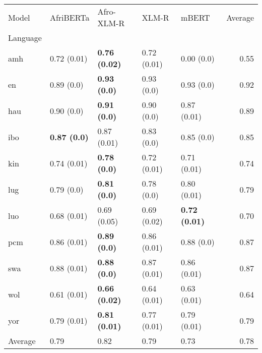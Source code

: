 \begin{tabular}{lllllr}
\toprule
Model &            AfriBERTa &            Afro-XLM-R &        XLM-R &                 mBERT & Average \\
Language &                      &                       &              &                       &         \\
\midrule
amh      &          0.72 (0.01) &  \textbf{0.76 (0.02)} &  0.72 (0.01) &            0.00 (0.0) &    0.55 \\
en       &           0.89 (0.0) &   \textbf{0.93 (0.0)} &   0.93 (0.0) &            0.93 (0.0) &    0.92 \\
hau      &           0.90 (0.0) &   \textbf{0.91 (0.0)} &   0.90 (0.0) &           0.87 (0.01) &    0.89 \\
ibo      &  \textbf{0.87 (0.0)} &           0.87 (0.01) &   0.83 (0.0) &            0.85 (0.0) &    0.85 \\
kin      &          0.74 (0.01) &   \textbf{0.78 (0.0)} &  0.72 (0.01) &           0.71 (0.01) &    0.74 \\
lug      &           0.79 (0.0) &   \textbf{0.81 (0.0)} &   0.78 (0.0) &           0.80 (0.01) &    0.79 \\
luo      &          0.68 (0.01) &           0.69 (0.05) &  0.69 (0.02) &  \textbf{0.72 (0.01)} &    0.70 \\
pcm      &          0.86 (0.01) &   \textbf{0.89 (0.0)} &  0.86 (0.01) &            0.88 (0.0) &    0.87 \\
swa      &          0.88 (0.01) &   \textbf{0.88 (0.0)} &  0.87 (0.01) &           0.86 (0.01) &    0.87 \\
wol      &          0.61 (0.01) &  \textbf{0.66 (0.02)} &  0.64 (0.01) &           0.63 (0.01) &    0.64 \\
yor      &          0.79 (0.01) &  \textbf{0.81 (0.01)} &  0.77 (0.01) &           0.79 (0.01) &    0.79 \\
\midrule
Average  &                 0.79 &                  0.82 &         0.79 &                  0.73 &    0.78 \\
\bottomrule
\end{tabular}
